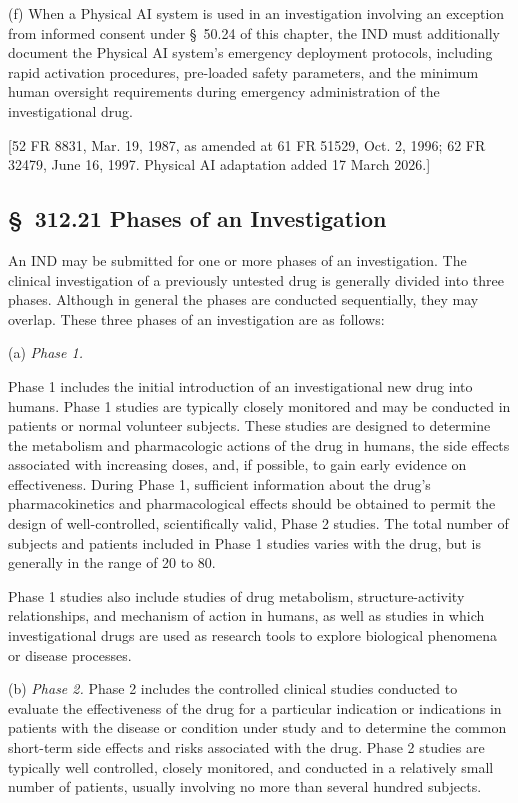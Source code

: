 \documentclass[11pt]{article}
\begin{document}
(f) When a Physical AI system is used in an investigation involving an exception from informed consent under \S~50.24 of this chapter, the IND must additionally document the Physical AI system's emergency deployment protocols, including rapid activation procedures, pre-loaded safety parameters, and the minimum human oversight requirements during emergency administration of the investigational drug.

[52 FR 8831, Mar. 19, 1987, as amended at 61 FR 51529, Oct. 2, 1996; 62 FR 32479, June 16, 1997. Physical AI adaptation added 17 March 2026.]

\subsection{\S~312.21 Phases of an Investigation}

An IND may be submitted for one or more phases of an investigation. The clinical investigation of a previously untested drug is generally divided into three phases. Although in general the phases are conducted sequentially, they may overlap. These three phases of an investigation are as follows:

(a) \textit{Phase 1.}

\begin{description}[leftmargin=0.5cm,style=sameline]
\item[(1)] Phase 1 includes the initial introduction of an investigational new drug into humans. Phase 1 studies are typically closely monitored and may be conducted in patients or normal volunteer subjects. These studies are designed to determine the metabolism and pharmacologic actions of the drug in humans, the side effects associated with increasing doses, and, if possible, to gain early evidence on effectiveness. During Phase 1, sufficient information about the drug's pharmacokinetics and pharmacological effects should be obtained to permit the design of well-controlled, scientifically valid, Phase 2 studies. The total number of subjects and patients included in Phase 1 studies varies with the drug, but is generally in the range of 20 to 80.
\item[(2)] Phase 1 studies also include studies of drug metabolism, structure-activity relationships, and mechanism of action in humans, as well as studies in which investigational drugs are used as research tools to explore biological phenomena or disease processes.
\end{description}

(b) \textit{Phase 2.} Phase 2 includes the controlled clinical studies conducted to evaluate the effectiveness of the drug for a particular indication or indications in patients with the disease or condition under study and to determine the common short-term side effects and risks associated with the drug. Phase 2 studies are typically well controlled, closely monitored, and conducted in a relatively small number of patients, usually involving no more than several hundred subjects.
\end{document}
